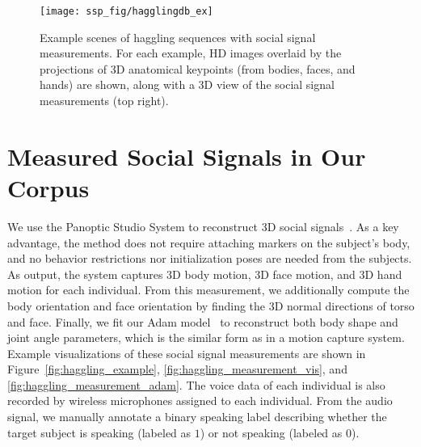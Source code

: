 \begin{figure}
	\centering
	\texttt{[image: ssp\_fig/hagglingdb\_ex]}
	\caption{Example scenes of haggling sequences with social signal measurements. For each example, HD images overlaid by the projections of 3D anatomical keypoints (from bodies, faces, and hands) are shown, along with a 3D view of the social signal measurements (top right).} 
	\label{fig:haggling_db}
\end{figure}

\section{Measured Social Signals in Our Corpus}
We use the Panoptic Studio System to reconstruct 3D social signals~\cite{joo2017panoptic, joo2018}. As a key advantage, the method does not require attaching markers on the subject's body, and no behavior restrictions nor initialization poses are needed from the subjects. As output, the system captures 3D body motion, 3D face motion, and 3D hand motion for each individual. From this measurement, we additionally compute the body orientation and face orientation by finding the 3D normal directions of torso and face. Finally, we fit our Adam model~\cite{joo2018} to reconstruct both body shape and joint angle parameters, which is the similar form as in a motion capture system. Example visualizations of these social signal measurements are shown in Figure~\ref{fig:haggling_example}, \ref{fig:haggling_measurement_vis}, and \ref{fig:haggling_measurement_adam}. The voice data of each individual is also recorded by wireless microphones assigned to each individual. From the audio signal, we manually annotate a binary speaking label describing whether the target subject is speaking (labeled as $1$) or not speaking (labeled as $0$).


